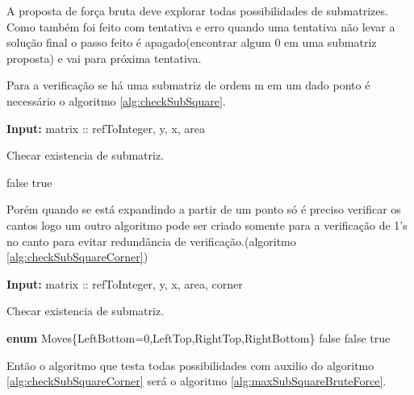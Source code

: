 \documentclass[10.9pt]{article}
\begin{document}
A proposta de força bruta deve explorar todas possibilidades de submatrizes. Como também foi feito com tentativa e erro quando uma tentativa não levar a solução final o passo feito é apagado(encontrar algum 0 em uma submatriz proposta) e vai para próxima tentativa.

Para a verificação se há uma submatriz de ordem m em um dado ponto é necessário o algoritmo \ref{alg:checkSubSquare}.

\begin{algorithm}
\textbf{Input:} matrix :: refToInteger, y, x, area
\caption{Checar existencia de submatriz.}\label{alg:checkSubSquare}
\begin{algorithmic}[1]
		    \State \Return false
		\EndIf
            \EndFor
	\EndFor
	\State \Return true
  \EndProcedure
\end{algorithmic}
\end{algorithm}

Porém quando se está expandindo a partir de um ponto só é preciso verificar os cantos logo um outro algoritmo pode ser criado somente para a verificação de 1's no canto para evitar redundância de verificação.(algoritmo \ref{alg:checkSubSquareCorner})

\begin{algorithm}
\textbf{Input:} matrix :: refToInteger, y, x, area, corner
\caption{Checar existencia de submatriz.}\label{alg:checkSubSquareCorner}
\begin{algorithmic}[1]
\State \textbf{enum} Moves\{LeftBottom=0,LeftTop,RightTop,RightBottom\}
 
		\State \Return false
	    \EndIf
	\EndFor
		\State \Return false
	    \EndIf
	\EndFor
	\State \Return true
  \EndProcedure
\end{algorithmic}
\end{algorithm}

Então o algoritmo que testa todas possibilidades com auxilio do algoritmo \ref{alg:checkSubSquareCorner} será o algoritmo \ref{alg:maxSubSquareBruteForce}.
\end{document}
